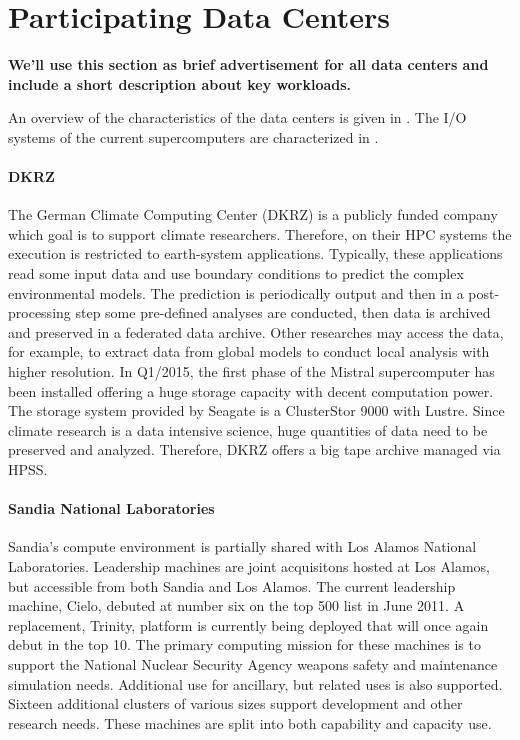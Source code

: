 \documentclass{superfri}
\numberwithin{equation}{section}
\begin{document}
\section{Participating Data Centers}
\label{sec:centers}

\textbf{We'll use this section as brief advertisement for all data centers and include a short description about key workloads.}

An overview of the characteristics of the data centers is given in .
The I/O systems of the current supercomputers are characterized in .

\paragraph{DKRZ}
The German Climate Computing Center (DKRZ) is a publicly funded company 
which goal is to support climate researchers.
Therefore, on their HPC systems the execution is restricted to earth-system applications.
Typically, these applications read some input data and use boundary conditions to predict the complex environmental models.
The prediction is periodically output and then in a post-processing step some pre-defined analyses are conducted, then data is archived and preserved in a federated data archive. 
Other researches may access the data, for example, to extract data from global models to conduct local analysis with higher resolution.
In Q1/2015, the first phase of the Mistral supercomputer has been installed offering a huge storage capacity with decent 
computation power.
The storage system provided by Seagate is a ClusterStor 9000 with Lustre.
Since climate research is a data intensive science, huge quantities of data need to be preserved and analyzed.
Therefore, DKRZ offers a big tape archive managed via HPSS.

\paragraph{Sandia National Laboratories}
Sandia's compute environment is partially shared with Los Alamos National
Laboratories. Leadership machines are joint acquisitons hosted at Los Alamos,
but accessible from both Sandia and Los Alamos. The current leadership machine,
Cielo, debuted at number six on the top 500 list in June 2011. A replacement,
Trinity, platform is currently being deployed that will once again debut in the
top 10.  The primary computing mission for these machines is to support the
National Nuclear Security Agency weapons safety and maintenance simulation
needs.  Additional use for ancillary, but related uses is also supported.
Sixteen additional clusters of various sizes support development and other
research needs. These machines are split into both capability and capacity use.
\end{document}
